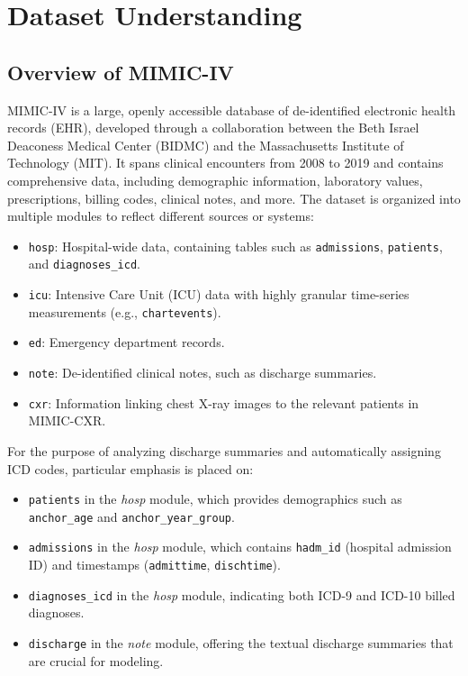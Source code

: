 \chapter{Dataset Understanding}
\label{chap:dataset_understanding}

\section{Overview of MIMIC-IV}
\noindent
MIMIC-IV is a large, openly accessible database of de-identified electronic health records (EHR), developed through a collaboration between the Beth Israel Deaconess Medical Center (BIDMC) and the Massachusetts Institute of Technology (MIT). It spans clinical encounters from 2008 to 2019 and contains comprehensive data, including demographic information, laboratory values, prescriptions, billing codes, clinical notes, and more. The dataset is organized into multiple modules to reflect different sources or systems:
\begin{itemize}
    \item \texttt{hosp}: Hospital-wide data, containing tables such as \texttt{admissions}, \texttt{patients}, and \texttt{diagnoses\_icd}.
    \item \texttt{icu}: Intensive Care Unit (ICU) data with highly granular time-series measurements (e.g., \texttt{chartevents}).
    \item \texttt{ed}: Emergency department records.
    \item \texttt{note}: De-identified clinical notes, such as discharge summaries.
    \item \texttt{cxr}: Information linking chest X-ray images to the relevant patients in MIMIC-CXR.
\end{itemize}

\vspace{5pt}
\noindent
For the purpose of analyzing discharge summaries and automatically assigning ICD codes, particular emphasis is placed on:
\begin{itemize}
    \item \texttt{patients} in the \textit{hosp} module, which provides demographics such as \texttt{anchor\_age} and \texttt{anchor\_year\_group}.
    \item \texttt{admissions} in the \textit{hosp} module, which contains \texttt{hadm\_id} (hospital admission ID) and timestamps (\texttt{admittime}, \texttt{dischtime}).
    \item \texttt{diagnoses\_icd} in the \textit{hosp} module, indicating both ICD-9 and ICD-10 billed diagnoses.
    \item \texttt{discharge} in the \textit{note} module, offering the textual discharge summaries that are crucial for modeling.
\end{itemize}

